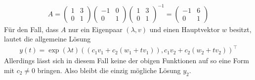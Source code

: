 \begin{solution}
\begin{align*}
A =
  \begin{pmatrix}
    1 & 3 \\ 0 & 1
  \end{pmatrix}
  \begin{pmatrix}
    -1 & 0 \\ 0 & 1
  \end{pmatrix}
  \begin{pmatrix}
    1 & 3 \\ 0 & 1
  \end{pmatrix}^{-1}
  =
  \begin{pmatrix}
    -1 & 6 \\ 0 & 1
  \end{pmatrix}
\end{align*}
Für den Fall, dass $A$ nur ein Eigenpaar $(\lambda,v)$ und einen Hauptvektor $w$
besitzt, lautet die allgemeine Lösung
\begin{align*}
  y(t) = \exp(\lambda t)((c_1v_1 + c_2(w_1 + tv_1)),c_1v_2 + c_2(w_2 + tv_2))^{\top}
\end{align*}
Allerdings lässt sich in diesem Fall keine der obigen Funktionen auf so eine Form
mit $c_2 \neq 0$ bringen. Also bleibt die einzig mögliche Lösung $y_2$.
\end{solution}
